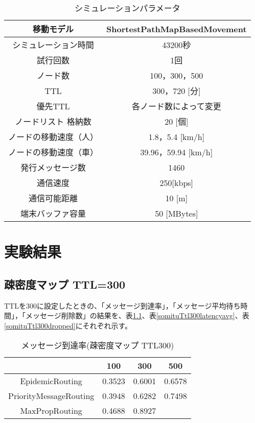 \documentclass[11pt]{icsthesis}
\begin{document}
\begin{table}[h]
    \begin{center}
      \caption[]{シミュレーションパラメータ}
      \label{example:terminology}
      \begin{tabular}{|c|c|}
        \hline
        移動モデル & ShortestPathMapBasedMovement\\
        \hline
        シミュレーション時間 & 43200秒\\
        \hline
        試行回数 & 1回\\
        \hline
        ノード数 & 100，300，500\\
        \hline
        TTL & 300，720 [分]\\
        \hline
        優先TTL & 各ノード数によって変更\\
        \hline
        ノードリスト
        格納数 & 20 [個]\\
        \hline
        ノードの移動速度（人） & 1.8，5.4 [km/h]\\
        \hline
        ノードの移動速度（車） & 39.96，59.94 [km/h]\\
        \hline
        発行メッセージ数 & 1460\\
        \hline
        通信速度 & 250[kbps]\\
        \hline
        通信可能距離 & 10 [m]\\
        \hline
        端末バッファ容量 & 50 [MBytes]\\
        \hline
      \end{tabular}
    \end{center}
\end{table}
\chapter{実験結果}

\section{疎密度マップ TTL=300}
TTLを300に設定したときの、「メッセージ到達率」，「メッセージ平均待ち時間」，「メッセージ削除数」の結果を、表\ref{somituTtl300deliveryprob}、表\ref{somituTtl300latencyavg}、表\ref{somituTtl300dropped}にそれぞれ示す。
\begin{table}[H]
 \begin{center}
      \caption[]{メッセージ到達率(疎密度マップ TTL300)}
      \label{somituTtl300deliveryprob}
      \begin{tabular}{|c|c|c|c|}
\hline
&100&300&500\\
\hline
EpidemicRouting&0.3523&0.6001&0.6578\\
\hline
PriorityMessageRouting&0.3948&0.6282&0.7498\\
\hline
MaxPropRouting&0.4688&0.8927&\\
\hline
      \end{tabular}
    \end{center}
\end{table}
\end{document}
